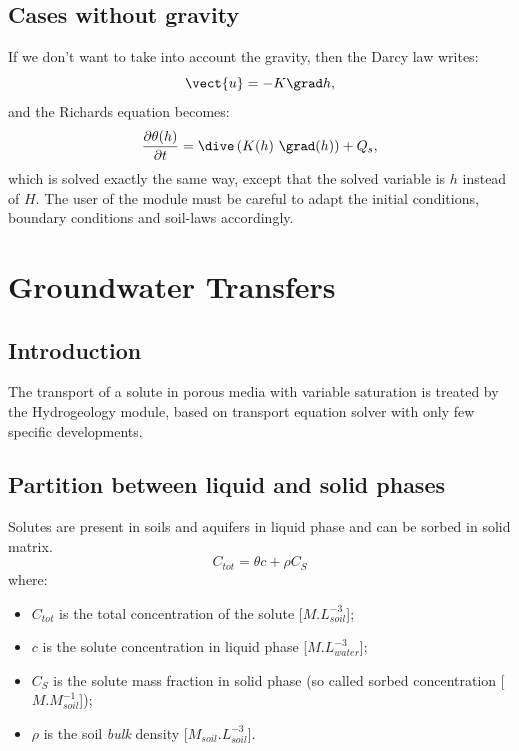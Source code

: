 \subsection{Cases without gravity}
If we don't want to take into account the gravity, then the Darcy law writes:
\begin{equation}
\label{eq:groundwater:darcy_without_gravity}
 \vect{u} = - K \grad h,
\end{equation}
and the Richards equation becomes:
\begin{equation}
 \frac{\partial{\theta(h)}}{\partial{t}} = \dive \left( K(h) \ \grad(h) \right) + Q_s,
\end{equation}
which is solved exactly the same way, except that the solved variable is $h$ instead of $H$. The user of the module
must be careful to adapt the initial conditions, boundary conditions and soil-laws accordingly.

\section{Groundwater Transfers}

\subsection{Introduction}
The transport of a solute in porous media with variable saturation is treated by
the Hydrogeology module, based on \CS transport equation solver with only few
specific developments.

\subsection{Partition between liquid and solid phases}
Solutes are present in soils and aquifers in liquid phase and can be sorbed
in solid matrix.
\begin{equation}
\label{eq:groundwater:partition_liquid_solid}
  C_{tot} = \theta c + \rho C_S
\end{equation}
where:
\begin{itemize}
  \item $C_{tot}$ is the total concentration of the solute [$M.L^{-3}_{soil}$];
  \item $c$ is the solute concentration in liquid phase [$M.L^{-3}_{water}$];
  \item $C_S$ is the solute mass fraction in solid phase (so called sorbed
        concentration [$M.M^{-1}_{soil}$]);
  \item $\rho$ is the soil \textit{bulk} density [$M_{soil}.L^{-3}_{soil}$].
\end{itemize}

